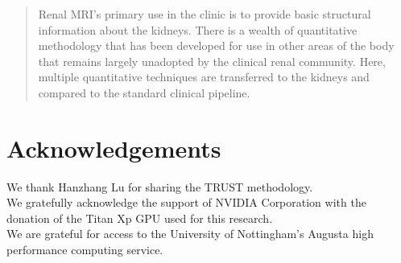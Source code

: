 \documentclass[11pt,a4paper,oneside]{report}
\begin{document}
\begin{abstract}
\thispagestyle{plain}

Renal MRI's primary use in the clinic is to provide basic structural information about the kidneys. There is a wealth of quantitative methodology that has been developed for use in other areas of the body that remains largely unadopted by the clinical renal community. Here, multiple quantitative techniques are transferred to the kidneys and compared to the standard clinical pipeline. 

\end{abstract}

\setcounter{tocdepth}{2}
\tableofcontents
\newpage
{}
\acresetall
\setcounter{page}{1}


\newpage



\newpage



\newpage

%


\newpage

\chapter*{Acknowledgements}

We thank Hanzhang Lu for sharing the TRUST methodology.\\

We gratefully acknowledge the support of NVIDIA Corporation with the donation of the Titan Xp GPU used for this research.\\

We are grateful for access to the University of Nottingham's Augusta high performance computing service.
\end{document}
